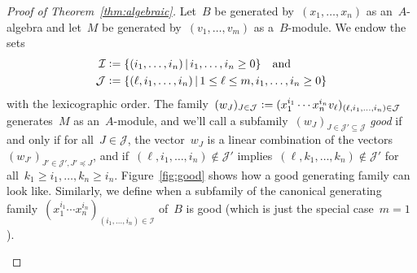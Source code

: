 \documentclass{amsart}
\theoremstyle{definition}
\theoremstyle{plain}
\theoremstyle{remark}
\newcommand{\I}{\mathcal{I}}
\newcommand{\J}{\mathcal{J}}
\newcommand{\defeq}{\vcentcolon=}
\begin{document}
\begin{proof}[Proof of Theorem~\ref{thm:algebraic}]
Let~$B$ be generated by~$(x_1,\ldots,x_n)$ as an~$A$-algebra and
let~$M$ be generated by~$(v_1,\ldots,v_m)$ as a~$B$-module. We endow the sets
\begin{align*}
  \I &\defeq \{ (i_1,\ldots,i_n) \,|\, i_1,\ldots,i_n \geq 0 \}
  \quad\text{and} \\
  \J &\defeq \{ (\ell, i_1,\ldots,i_n) \,|\, 1 \leq \ell \leq m, i_1,\ldots,i_n \geq 0 \}
\end{align*}
with the lexicographic order. The family~$(w_J)_{J \in \J} \defeq (x_1^{i_1}
\cdots x_n^{i_n} v_\ell)_{(\ell,i_1,\ldots,i_n) \in \J}$ generates~$M$ as
an~$A$-module, and we'll call a subfamily~$(w_J)_{J \in \J' \subseteq \J}$
\emph{good} if and only if for all~$J \in \J$, the vector~$w_J$ is a linear
combination of the vectors~$(w_{J'})_{J' \in \J', J' \preceq J}$,
and if~$(\ell,i_1,\ldots,i_n) \not\in \J'$ implies~$(\ell,k_1,\ldots,k_n) \not\in
\J'$ for all~$k_1 \geq i_1, \ldots, k_n \geq i_n$. Figure~\ref{fig:good} shows
how a good generating family can look like.
Similarly, we define when a subfamily of the canonical generating
family~$(x_1^{i_1} \cdots x_n^{i_n})_{(i_1,\ldots,i_n) \in \I}$ of~$B$ is good
(which is just the special case~$m = 1$).

\begin{figure}[t]
  \captionsetup{width=.9\linewidth}
\end{figure}
\end{proof}
\end{document}
